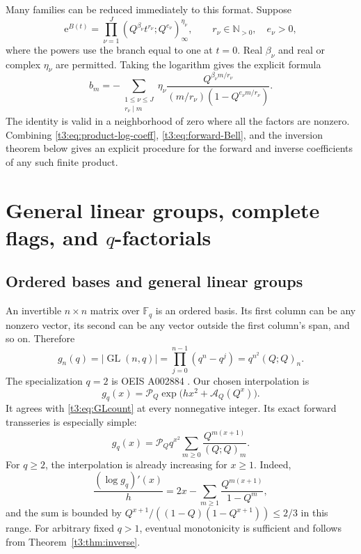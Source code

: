 \documentclass[11pt,openany]{book}
\numberwithin{equation}{chapter}
\theoremstyle{plain}
\theoremstyle{definition}
\theoremstyle{remark}
\newcommand{\ee}{\mathrm e}
\newcommand{\N}{\mathbb N}\newcommand{\R}{\mathbb R}\newcommand{\C}{\mathbb C}\newcommand{\Z}{\mathbb Z}
\newcommand{\F}{\mathbb F}
\newcommand{\pp}[1]{(Q;Q)_{#1}}
\newcommand{\Pinf}{\mathcal P_Q}
\newcommand{\A}{\mathcal A_Q}
\newcommand{\GL}{\operatorname{GL}}\newcommand{\Sp}{\operatorname{Sp}}
\begin{document}
Many families can be reduced immediately to this format. Suppose
\begin{equation}\label{t3:eq:product-rule}
 \ee^{B(t)}=\prod_{\nu=1}^J
       (Q^{\beta_\nu}t^{r_\nu};Q^{e_\nu})_\infty^{\eta_\nu},
 \qquad r_\nu\in\N_{>0},\quad e_\nu>0,
\end{equation}
where the powers use the branch equal to one at $t=0$. Real $\beta_\nu$ and real or complex $\eta_\nu$ are permitted. Taking the logarithm gives the explicit formula
\begin{equation}\label{t3:eq:product-log-coeff}
 b_m=-\sum_{\substack{1\le\nu\le J\\r_\nu\mid m}}
 \eta_\nu\frac{Q^{\beta_\nu m/r_\nu}}
 {(m/r_\nu)(1-Q^{e_\nu m/r_\nu})}.
\end{equation}
The identity is valid in a neighborhood of zero where all the factors are nonzero. Combining \eqref{t3:eq:product-log-coeff}, \eqref{t3:eq:forward-Bell}, and the inversion theorem below gives an explicit procedure for the forward and inverse coefficients of any such finite product.

\chapter{General linear groups, complete flags, and $q$-factorials}
\label{ct:ch:GL}

\label{t3:sec:GL}

\section{Ordered bases and general linear groups}

An invertible $n\times n$ matrix over $\F_q$ is an ordered basis. Its first column can be any nonzero vector, its second can be any vector outside the first column's span, and so on. Therefore
\begin{equation}\label{t3:eq:GLcount}
 g_n(q)=|\GL(n,q)|=\prod_{j=0}^{n-1}(q^n-q^j)
       =q^{n^2}\pp{n}.
\end{equation}
The specialization $q=2$ is OEIS A002884 \cite{oeisGL}. Our chosen interpolation is
\begin{equation}\label{t3:eq:GLinterp}
 g_q(x)=\Pinf\exp\bigl(hx^2+\A(Q^x)\bigr).
\end{equation}
It agrees with \eqref{t3:eq:GLcount} at every nonnegative integer. Its exact forward transseries is especially simple:
\begin{equation}\label{t3:eq:GLforward}
 g_q(x)=\Pinf q^{x^2}
       \sum_{m\ge0}\frac{Q^{m(x+1)}}{\pp{m}}.
\end{equation}
For $q\ge2$, the interpolation is already increasing for $x\ge1$. Indeed,
\[
 \frac{(\log g_q)'(x)}h
 =2x-\sum_{m\ge1}\frac{Q^{m(x+1)}}{1-Q^m},
\]
and the sum is bounded by
$Q^{x+1}/((1-Q)(1-Q^{x+1}))\le2/3$ in this range.
For arbitrary fixed $q>1$, eventual monotonicity is sufficient and follows from Theorem~\ref{t3:thm:inverse}.
\end{document}
